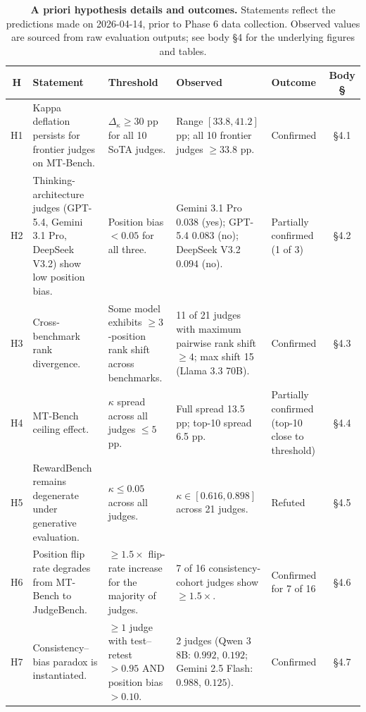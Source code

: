 \begin{table}[!t]
\centering
\footnotesize
\setlength{\tabcolsep}{4pt}
\begin{tabular}{cp{3.6cm}p{2.8cm}p{4.4cm}p{1.9cm}c}
\toprule
\textbf{H} & \textbf{Statement} & \textbf{Threshold} & \textbf{Observed} & \textbf{Outcome} & \textbf{Body §} \\
\midrule
H1 & Kappa deflation persists for frontier judges on MT-Bench. &
   $\Delta_\kappa \geq 30$ pp for all 10 SoTA judges. &
   Range $[33.8, 41.2]$ pp; all 10 frontier judges $\geq 33.8$ pp. &
   Confirmed & §4.1 \\
\addlinespace
H2 & Thinking-architecture judges (GPT-5.4, Gemini 3.1 Pro, DeepSeek V3.2) show low position bias. &
   Position bias $< 0.05$ for all three. &
   Gemini 3.1 Pro $0.038$ (yes); GPT-5.4 $0.083$ (no); DeepSeek V3.2 $0.094$ (no). &
   Partially confirmed (1 of 3) & §4.2 \\
\addlinespace
H3 & Cross-benchmark rank divergence. &
   Some model exhibits $\geq 3$-position rank shift across benchmarks. &
   11 of 21 judges with maximum pairwise rank shift $\geq 4$; max shift 15 (Llama 3.3 70B). &
   Confirmed & §4.3 \\
\addlinespace
H4 & MT-Bench ceiling effect. &
   $\kappa$ spread across all judges $\leq 5$ pp. &
   Full spread 13.5 pp; top-10 spread 6.5 pp. &
   Partially confirmed (top-10 close to threshold) & §4.4 \\
\addlinespace
H5 & RewardBench remains degenerate under generative evaluation. &
   $\kappa \leq 0.05$ across all judges. &
   $\kappa \in [0.616, 0.898]$ across 21 judges. &
   Refuted & §4.5 \\
\addlinespace
H6 & Position flip rate degrades from MT-Bench to JudgeBench. &
   $\geq 1.5\times$ flip-rate increase for the majority of judges. &
   7 of 16 consistency-cohort judges show $\geq 1.5\times$. &
   Confirmed for 7 of 16 & §4.6 \\
\addlinespace
H7 & Consistency--bias paradox is instantiated. &
   $\geq 1$ judge with test--retest $> 0.95$ AND position bias $> 0.10$. &
   2 judges (Qwen 3 8B: $0.992$, $0.192$; Gemini 2.5 Flash: $0.988$, $0.125$). &
   Confirmed & §4.7 \\
\bottomrule
\end{tabular}
\caption{\textbf{A priori hypothesis details and outcomes.} Statements
reflect the predictions made on 2026-04-14, prior to Phase 6 data
collection. Observed values are sourced from raw evaluation outputs;
see body §4 for the underlying figures and tables.}
\label{tab:appendix-hypotheses}
\end{table}

